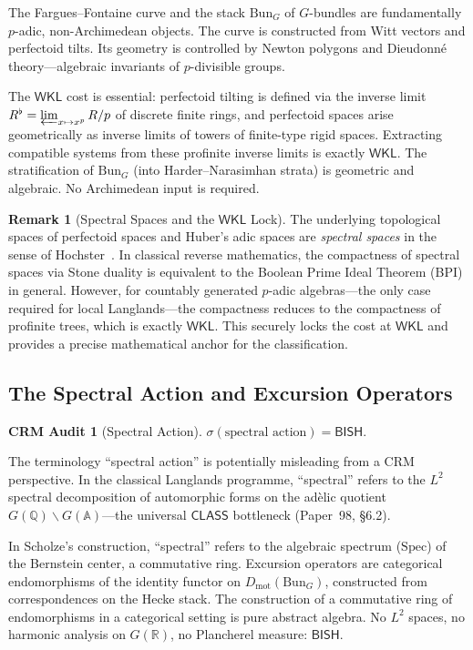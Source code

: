 \documentclass[11pt,a4paper]{article}
\theoremstyle{plain}
\theoremstyle{definition}
\newtheorem{remark}[theorem]{Remark}
\newtheorem{audit}[theorem]{CRM Audit}
\newcommand{\BISH}{\textsf{BISH}}
\newcommand{\WKL}{\textsf{WKL}}
\newcommand{\CLASS}{\textsf{CLASS}}
\newcommand{\Dmot}{D_{\mathrm{mot}}}
\newcommand{\Bun}{\mathrm{Bun}}
\newcommand{\Spec}{\mathrm{Spec}}
\newcommand{\Q}{\mathbb{Q}}
\newcommand{\R}{\mathbb{R}}
\newcommand{\A}{\mathbb{A}}
\newcommand{\sig}{\sigma}
\begin{document}
The Fargues--Fontaine curve and the stack $\Bun_G$ of $G$-bundles are fundamentally $p$-adic, non-Archimedean objects. The curve is constructed from Witt vectors and perfectoid tilts. Its geometry is controlled by Newton polygons and Dieudonn\'e theory---algebraic invariants of $p$-divisible groups.

The $\WKL$ cost is essential: perfectoid tilting is defined via the inverse limit $R^\flat = \varprojlim_{x \mapsto x^p} R/p$ of discrete finite rings, and perfectoid spaces arise geometrically as inverse limits of towers of finite-type rigid spaces. Extracting compatible systems from these profinite inverse limits is exactly $\WKL$. The stratification of $\Bun_G$ (into Harder--Narasimhan strata) is geometric and algebraic. No Archimedean input is required.

\begin{remark}[Spectral Spaces and the $\WKL$ Lock]
The underlying topological spaces of perfectoid spaces and Huber's adic spaces are \emph{spectral spaces} in the sense of Hochster~\cite{hochster69}. In classical reverse mathematics, the compactness of spectral spaces via Stone duality is equivalent to the Boolean Prime Ideal Theorem (BPI) in general. However, for countably generated $p$-adic algebras---the only case required for local Langlands---the compactness reduces to the compactness of profinite trees, which is exactly $\WKL$. This securely locks the cost at $\WKL$ and provides a precise mathematical anchor for the classification.
\end{remark}


\subsection{The Spectral Action and Excursion Operators}

\begin{audit}[Spectral Action]\label{audit:spectral}
$\sig(\text{spectral action}) = \BISH$.
\end{audit}

The terminology ``spectral action'' is potentially misleading from a CRM perspective. In the classical Langlands programme, ``spectral'' refers to the $L^2$ spectral decomposition of automorphic forms on the ad\`elic quotient $G(\Q)\backslash G(\A)$---the universal $\CLASS$ bottleneck (Paper~98, \S6.2).

In Scholze's construction, ``spectral'' refers to the algebraic spectrum ($\Spec$) of the Bernstein center, a commutative ring. Excursion operators are categorical endomorphisms of the identity functor on $\Dmot(\Bun_G)$, constructed from correspondences on the Hecke stack. The construction of a commutative ring of endomorphisms in a categorical setting is pure abstract algebra. No $L^2$ spaces, no harmonic analysis on $G(\R)$, no Plancherel measure: $\BISH$.
\end{document}
